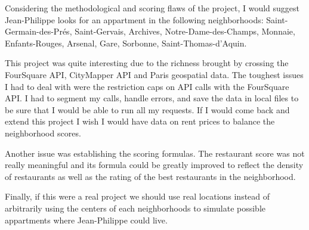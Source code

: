 \documentclass[11pt]{article}
\begin{document}
Considering the methodological and scoring flaws of the project, I would
suggest Jean-Philippe looks for an appartment in the following
neighborhoods: Saint-Germain-des-Prés, Saint-Gervais, Archives,
Notre-Dame-des-Champs, Monnaie, Enfants-Rouges, Arsenal, Gare, Sorbonne,
Saint-Thomas-d'Aquin.

This project was quite interesting due to the richness brought by
crossing the FourSquare API, CityMapper API and Paris geospatial data.
The toughest issues I had to deal with were the restriction caps on API
calls with the FourSquare API. I had to segment my calls, handle errors,
and save the data in local files to be sure that I would be able to run
all my requests. If I would come back and extend this project I wish I
would have data on rent prices to balance the neighborhood scores.

Another issue was establishing the scoring formulas. The restaurant
score was not really meaningful and its formula could be greatly
improved to reflect the density of restaurants as well as the rating of
the best restaurants in the neighborhood.

Finally, if this were a real project we should use real locations
instead of arbitrarily using the centers of each neighborhoods to
simulate possible appartments where Jean-Philippe could live.


    
    
    
    
\end{document}
